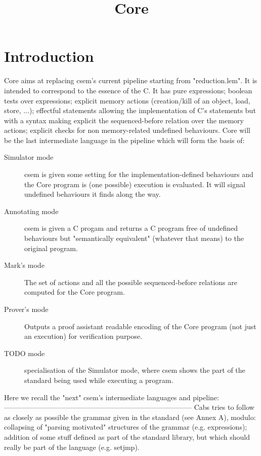 \documentclass[12pt, a4paper]{article}
\title{Core}
\author{}
\date{}
\begin{document}

\nocite{*} 

\maketitle

\section{Introduction}
Core aims at replacing csem's current pipeline starting from "reduction.lem".
It is intended to correspond to the essence of the C.
It has pure expressions; boolean tests over expressions;
explicit memory actions (creation/kill of an object, load, store, ...);
effectful statements allowing the implementation of C's statements but with a syntax making explicit the sequenced-before relation over the memory actions;
explicit checks for non memory-related undefined behaviours.  Core will be the last intermediate language in the pipeline which will form the basis of:

\begin{description}
\item[Simulator mode]
  csem is given some setting for the implementation-defined behaviours and the Core program is (one possible) execution is evaluated.
  It will signal undefined behaviours it finds along the way.
  
  \item[Annotating mode]
  csem is given a C progam and returns a C program free of undefined behaviours but "semantically equivalent" (whatever that means) to the original program.
  
  \item[Mark's mode]
  The set of actions and all the possible sequenced-before relations are computed for the Core program.
  
  \item[Prover's mode]
  Outputs a proof assistant readable encoding of the Core program (not just an execution) for verification purpose.
  
  \item[TODO mode]
  specialisation of the Simulator mode, where csem shows the part of the standard being used while executing a program.
\end{description}

\newpage

Here we recall the "next" csem's intermediate languages and pipeline:
--------------------------------------------------------------------------------
Cabs    tries to follow as closely as possible the grammar given in the standard
        (see Annex A), modulo: collapsing of "parsing motivated" structures of
        the grammar (e.g. expressions); addition of some stuff defined as part
        of the standard library, but which should really be part of the
        language (e.g. setjmp).
\end{document}
